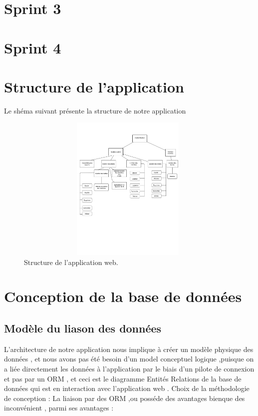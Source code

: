\section{ Sprint 3 }


\section{ Sprint 4 }


\section{Structure de l'application}
Le sh\'{e}ma suivant pr\'{e}sente la structure de notre application

\FloatBarrier
\begin{figure}[H]
\center
\includegraphics[width=11cm,height=7cm]{./figures/structure.png}
\caption{Structure de l'application web.}
\end{figure}
\FloatBarrier

\section{Conception de la base de donn\'{e}es}

\subsection{Mod\`{e}le du liason des donn\'{e}es }
L'architecture de notre application nous implique \`{a} cr\'{e}er un mod\`{e}le physique
des donn\'{e}es , et nous avons pas \'{e}t\'{e} besoin d'un model conceptuel logique
,puisque on a li\'{e}e directement les donn\'{e}es \`{a} l'application par le biais d'un
pilote de connexion et pas par un ORM , et ceci est le diagramme
Entit\'{e}s \textendash{}Relations de la base de donn\'{e}es qui est en interaction avec
l'application web .
Choix de la m\'{e}thodologie de conception :
La liaison par des ORM ,ou poss\'{e}de des avantages bienque des inconv\'{e}nient ,
parmi ses avantages :

